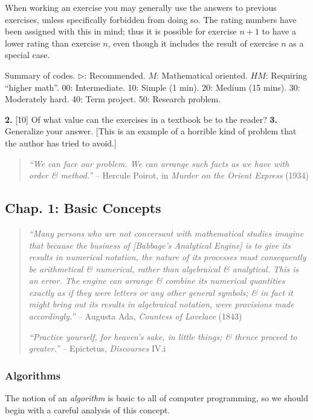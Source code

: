 \documentclass{article}
\begin{document}
When working an exercise you may generally use the answers to previous exercises, unless specifically forbidden from doing so. The rating numbers have been assigned with this in mind; thus it is possible for exercise $n + 1$ to have a lower rating than exercise $n$, even though it includes the result of exercise $n$ as a special case.

{\sf Summary of codes.} $\triangleright$: Recommended. $M$: Mathematical oriented. $HM$: Requiring ``higher math''. 00: Intermediate. 10: Simple (1 min). 20: Medium (15 mins). 30: Moderately hard. 40: Term project. 50: Research problem.

{\bf2.} [10] Of what value can the exercises in a textbook be to the reader? {\bf3.} Generalize your answer. [This is an example of a horrible kind of problem that the author has tried to avoid.]
\begin{quotation}
	{\it``We can face our problem. We can arrange such facts as we have with order \& method.''} -- {\sc Hercule Poirot}, in {\it Murder on the Orient Express} (1934)
\end{quotation}

\subsection{Chap. 1: Basic Concepts}

\begin{quotation}
	{\it``Many persons who are not conversant with mathematical studies imagine that because the business of [Babbage's Analytical Engine] is to give its results in numerical notation, the nature of its processes must consequently be arithmetical \& numerical, rather than algebraical \& analytical. This is an error. The engine can arrange \& combine its numerical quantities exactly as if they were letters or any other general symbols; \& in fact it might bring out its results in algebraical notation, were provisions made accordingly.''} -- {\sc Augusta Ada}, {\it Countess of Lovelace} (1843)
	
	{\it``Practice yourself, for heaven's sake, in little things; \& thence proceed to greater.''} -- {\sc Epictetus}, {\it Discourses} IV.i
\end{quotation}

\subsubsection{Algorithms}
The notion of an {\it algorithm} is basic to all of computer programming, so we should begin with a careful analysis of this concept.
\end{document}
